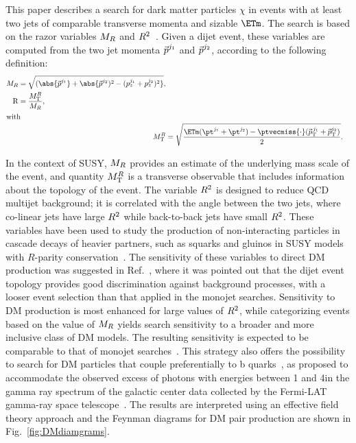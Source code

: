 This paper describes a search for dark matter particles $\chi$ in events with at least two jets of comparable transverse momenta
and sizable $\ETm$. The search is based
on the razor variables $M_R$ and $R^2$~\cite{rogan,razor2010}.  Given a
dijet event, these variables are computed from the two jet momenta $\vec{p\mkern0mu}^{j_1}$ and
$\vec{p\mkern0mu}^{j_2}$, according to the following
definition:
 \begin{align}
 \begin{split}
 \MR  & =
 \sqrt{
  (\abs{\vv{p}^{j_1}}+\abs{\vv{p}^{j_{2}})^2 -
  (p^{j_1}_{z}+p^{j_2}_{z})^2}},
\\
 \mathrm{R}  & =   \frac{M^{\RR}_\mathrm{T}}{\MR},
\label{eq:razor}
\end{split}\\
\intertext{with}
 \label{eq:MTR}
 M^{\RR}_\mathrm{T}  &=   \sqrt{ \frac{\ETm(\pt^{j_1}+\pt^{j_2}) -
   \ptvecmiss {\cdot}
   (\vv{p}_{\mathrm{T}}^{\,j_1}+\vv{p}_{\mathrm{T}}^{j_2})}{2}}.
\end{align}

In the context of SUSY, $M_R$ provides an estimate of the
underlying mass scale of the event, and quantity $M^{R}_\mathrm{T}$ is a transverse
observable that includes information about the
topology of the event. The variable $R^2$ is designed to reduce QCD
multijet background; it is correlated with the angle
between the two jets, where co-linear jets have large $R^2$ while back-to-back jets have small $R^2$.
These variables have been used to study the production of non-interacting
particles in cascade decays of heavier partners, such as squarks and
gluinos in SUSY models with $R$-parity
conservation~\cite{Chatrchyan:2014goa,Razor8TeV}. The sensitivity of
these variables to direct DM production was suggested in
Ref.~\cite{Fox:2012ee}, where it was pointed out that the dijet event
topology provides good discrimination against background processes,
with a looser event selection than that applied in the monojet searches.
Sensitivity to DM production is most enhanced for large values of $R^2$, while
categorizing events based on the value of $M_R$ yields search sensitivity to
a broader and more inclusive class of DM models. The resulting sensitivity is expected to be 
comparable to that of monojet searches~\cite{Fox:2012ee,Papucci:2014iwa}. This
strategy also offers the possibility to search for DM particles that
couple preferentially to b quarks~\cite{Agrawal:2014una}, as proposed
to accommodate the observed excess of photons with energies between
1 and 4\GeV in the gamma ray spectrum of the galactic center data collected by the Fermi-LAT gamma-ray space
telescope~\cite{Hooper:2010mq}. The results are interpreted using an
effective field theory approach and the Feynman diagrams for DM pair production are shown in Fig.~\ref{fig:DMdiamgrams}.

